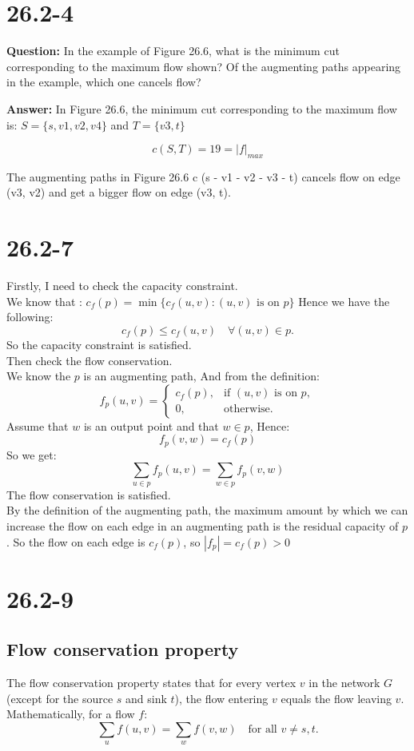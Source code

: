 \documentclass[12pt]{article}
\begin{document}
\section{26.2-4}
\textbf{Question:} In the example of Figure 26.6, what is the minimum cut corresponding to the maximum flow shown? Of the augmenting paths appearing in the example, which one cancels flow?

\textbf{Answer:} 
In Figure 26.6, the minimum cut corresponding to the maximum flow is: $S = \{s, v1, v2, v4\}$ and $T = \{v3, t\}$

\begin{equation}
c(S, T) = 19 = |f|_{max}
\end{equation}

The augmenting paths in Figure 26.6 c (s - v1 - v2 - v3 - t) cancels flow on edge (v3, v2) and get a bigger flow on edge (v3, t).

\section{26.2-7}
Firstly, I need to check the capacity constraint.\\
We know that : \(c_f(p) = \min \{ c_f(u, v) : (u, v) \text{ is on } p \}\)
Hence we have the following:
\[c_f(p) \leq c_f(u, v) \quad \forall (u, v) \in p.\]
So the capacity constraint is satisfied.\\
Then check the flow conservation.\\
We know the \(p\) is an augmenting path, And from the definition:
\[f_p(u, v) =
\begin{cases} 
c_f(p), & \text{if } (u, v) \text{ is on } p, \\ 
0, & \text{otherwise}.
\end{cases}\]
Assume that \(w\) is an output point and that \(w \in p\), Hence:
\[f_p(v, w) = c_f(p)\]
So we get: 
\[\sum_{u \in p} f_p(u, v) =\sum_{w \in p} f_p(v, w)\]
The flow conservation is satisfied.\\
By the definition of the augmenting path, the maximum amount by which we can increase the flow on each edge in an augmenting path is the residual capacity of \(p\).
So the flow on each edge is \(c_f(p)\), so \( |f_p| = c_f(p)> 0\)
\section{26.2-9}
\subsection{Flow conservation property}
The flow conservation property states that for every vertex $v$ in the network $G$ (except for the source $s$ and sink $t$), the flow entering $v$ equals the flow leaving $v$. Mathematically, for a flow $f$:
\[
\sum_{u} f(u, v) = \sum_{w} f(v, w) \quad \text{for all } v \neq s, t.
\]
\end{document}
